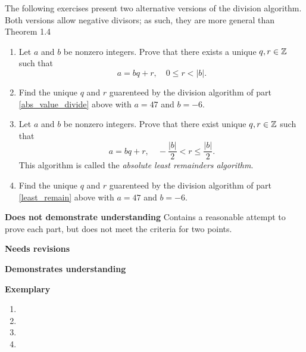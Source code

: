 \documentclass[letterpaper, 11pt]{../ximera}
\begin{document}
\begin{ex} The following exercises present two alternative versions of the division algorithm. Both versions allow negative divisors; as such, they are more general than Theorem 1.4
	\begin{enumerate}[label=(\alph*)]
		\item\label{abs_value_divide} Let $a$ and $b$ be nonzero integers. Prove that there exists a unique $q,r\in\mathbb Z$ such that 
		\[a=bq+r, \quad 0\leq r <|b|.\]
		\item Find the unique $q$ and $r$ guarenteed by the division algorithm of part \ref{abs_value_divide} above with $a=47$ and $b=-6$.
		\item\label{least_remain} Let $a$ and $b$ be nonzero integers. Prove that there exist unique $q,r\in\mathbb Z$ such that 
		\[a=bq+r,\quad -\frac{|b|}{2}<r\leq \frac{|b|}{2}.\] 
		This algorithm is called the \emph{absolute least remainders algorithm}.
		\item Find the unique $q$ and $r$ guarenteed by the division algorithm of part \ref{least_remain} above with $a=47$ and $b=-6$.
	\end{enumerate}
\end{ex}

\begin{writeRubric}
    \item \textbf{Does not demonstrate understanding}
     Contains a reasonable attempt to prove each part, but does not meet the criteria for two points.
    \item \textbf{Needs revisions}
     
    \item \textbf{Demonstrates understanding}
    
    \item \textbf{Exemplary}
        
\end{writeRubric}
                                       	
\begin{solution}
 \begin{enumerate}[label=(\alph*)]
		\item %
		\item %
		\item %
		\item %
\end{enumerate}

\end{solution}
\end{document}
